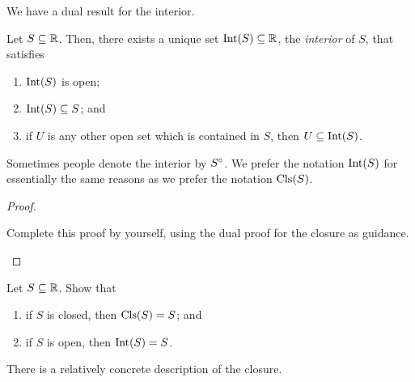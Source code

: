 We have a dual result for the interior.
\begin{prp}[Interior]
Let $S\subseteq \mathbb{R}$.  Then, there exists a unique set $\operatorname{Int} (S)\subseteq \mathbb{R}$, the \emph{interior} of $S$, that satisfies
\begin{enumerate}
\item $\operatorname{Int} (S)$ is open;
\item $\operatorname{Int} (S)\subseteq S$; and
\item if $U$ is any other open set which is contained in $S$, then $U\subseteq \operatorname{Int} (S)$.
\end{enumerate}
\begin{rmk}
Sometimes people denote the interior by $S\degree$.  We prefer the notation $\operatorname{Int} (S)$ for essentially the same reasons as we prefer the notation $\operatorname{Cls} (S)$.
\end{rmk}
\begin{proof}
\begin{exr}
Complete this proof by yourself, using the dual proof for the closure as guidance.
\end{exr}
\end{proof}
\end{prp}
\begin{exr}\label{exr3.4.38}
Let $S\subseteq \mathbb{R}$.  Show that
\begin{enumerate}
\item if $S$ is closed, then $\operatorname{Cls} (S)=S$; and
\item if $S$ is open, then $\operatorname{Int} (S)=S$.
\end{enumerate}
\end{exr}
There is a relatively concrete description of the closure.
